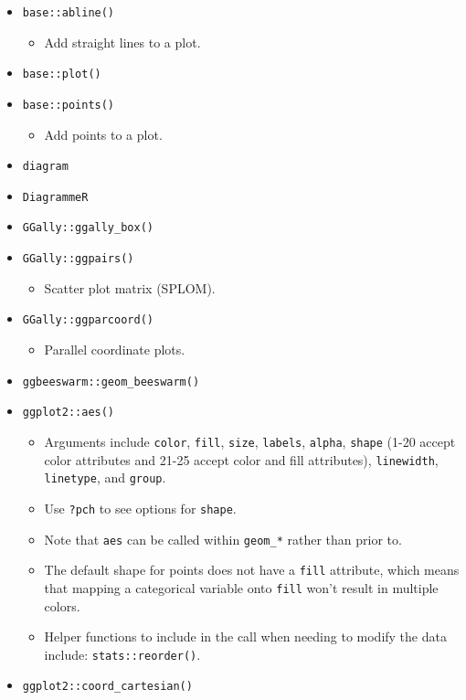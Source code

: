 \documentclass[
]{book}
\providecommand{\tightlist}{%
  \setlength{\itemsep}{0pt}\setlength{\parskip}{0pt}}
\begin{document}
\begin{itemize}
\tightlist
\item
  \texttt{base::abline()}

  \begin{itemize}
  \tightlist
  \item
    Add straight lines to a plot.
  \end{itemize}
\item
  \texttt{base::plot()}
\item
  \texttt{base::points()}

  \begin{itemize}
  \tightlist
  \item
    Add points to a plot.
  \end{itemize}
\item
  \texttt{diagram}
\item
  \texttt{DiagrammeR}
\item
  \texttt{GGally::ggally\_box()}
\item
  \texttt{GGally::ggpairs()}

  \begin{itemize}
  \tightlist
  \item
    Scatter plot matrix (SPLOM).
  \end{itemize}
\item
  \texttt{GGally::ggparcoord()}

  \begin{itemize}
  \tightlist
  \item
    Parallel coordinate plots.
  \end{itemize}
\item
  \texttt{ggbeeswarm::geom\_beeswarm()}
\item
  \texttt{ggplot2::aes()}

  \begin{itemize}
  \tightlist
  \item
    Arguments include \texttt{color}, \texttt{fill}, \texttt{size}, \texttt{labels}, \texttt{alpha}, \texttt{shape} (1-20 accept color attributes and 21-25 accept color and fill attributes), \texttt{linewidth}, \texttt{linetype}, and \texttt{group}.
  \item
    Use \texttt{?pch} to see options for \texttt{shape}.
  \item
    Note that \texttt{aes} can be called within \texttt{geom\_*} rather than prior to.
  \item
    The default shape for points does not have a \texttt{fill} attribute, which means that mapping a categorical variable onto \texttt{fill} won't result in multiple colors.
  \item
    Helper functions to include in the call when needing to modify the data include: \texttt{stats::reorder()}.
  \end{itemize}
\item
  \texttt{ggplot2::coord\_cartesian()}


\end{itemize}
\end{document}
